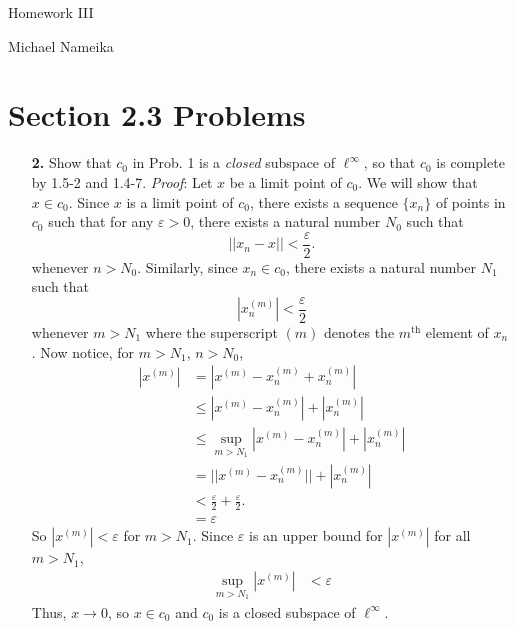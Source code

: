 \documentclass{article}
\title{}
\author{}
\date{}
\begin{document}
\begin{center}
    \vspace{0.5cm}
    {\Huge Homework III}
    \vspace{0.5cm}
    
    {\Large Michael Nameika}
    \vspace{0.5cm}
    
\end{center}

\section*{Section 2.3 Problems}
\begin{itemize}
    \item[\textbf{2.}] Show that $c_0$ in Prob. 1 is a \textit{closed} subspace of $\ell^{\infty}$, so that $c_0$ is complete by 1.5-2 and 1.4-7.
    \newline\newline
    \textit{Proof}: Let $x$ be a limit point of $c_0$. We will show that $x \in c_0$. Since $x$ is a limit point of $c_0$, there exists a sequence $\{x_n\}$ of points in $c_0$ such that for any $\varepsilon > 0$, there exists a natural number $N_0$ such that
    \[||x_n - x|| < \frac{\varepsilon}{2}.\]
    whenever $n > N_0$. Similarly, since $x_n \in c_0$, there exists a natural number $N_1$ such that
    \[|x_n^{(m)}| < \frac{\varepsilon}{2}\]
    whenever $m > N_1$ where the superscript $(m)$ denotes the $m^{\text{th}}$ element of $x_n$. Now notice, for $m > N_1$, $n > N_0$,
    \begin{align*}
        |x^{(m)}| &= |x^{(m)} - x_n^{(m)} + x_n^{(m)}|\\
        &\leq |x^{(m)} - x_n^{(m)}| + |x_n^{(m)}|\\
        &\leq \sup_{m > N_1}|x^{(m)} - x_n^{(m)}| + |x_n^{(m)}|\\
        &= ||x^{(m)} - x_n^{(m)}|| + |x_n^{(m)}|\\
        &< \frac{\varepsilon}{2} + \frac{\varepsilon}{2}.\\
        &= \varepsilon
    \end{align*}
    So $|x^{(m)}| < \varepsilon$ for $m > N_1$. Since $\varepsilon$ is an upper bound for $|x^{(m)}|$ for all $m > N_1$,
    \begin{align*}
        \sup_{m > N_1} |x^{(m)}| &< \varepsilon
    \end{align*}
    Thus, $x \to 0$, so $x \in c_0$ and $c_0$ is a closed subspace of $\ell^{\infty}$.
    

\end{itemize}
\end{document}
